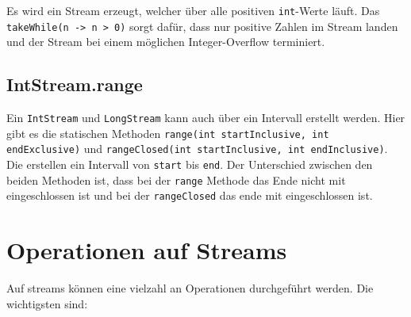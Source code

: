 Es wird ein Stream erzeugt, welcher über alle positiven \texttt{int}-Werte
läuft. Das \lstinline{takeWhile(n -> n > 0)} sorgt dafür, dass nur positive
Zahlen im Stream landen und der Stream bei einem möglichen Integer-Overflow
terminiert.

\subsection{IntStream.range}

Ein \lstinline{IntStream} und \lstinline{LongStream} kann auch über ein
Intervall erstellt werden. Hier gibt es die statischen Methoden
\lstinline{range(int startInclusive, int endExclusive)} und
\lstinline{rangeClosed(int startInclusive, int endInclusive)}. Die erstellen
ein Intervall von \texttt{start} bis \texttt{end}. Der Unterschied zwischen den
beiden Methoden ist, dass bei der \lstinline{range} Methode das Ende nicht mit
eingeschlossen ist und bei der \lstinline{rangeClosed} das ende mit
eingeschlossen ist.

\section{Operationen auf Streams}

Auf streams können eine vielzahl an Operationen durchgeführt werden. Die
wichtigsten sind:

